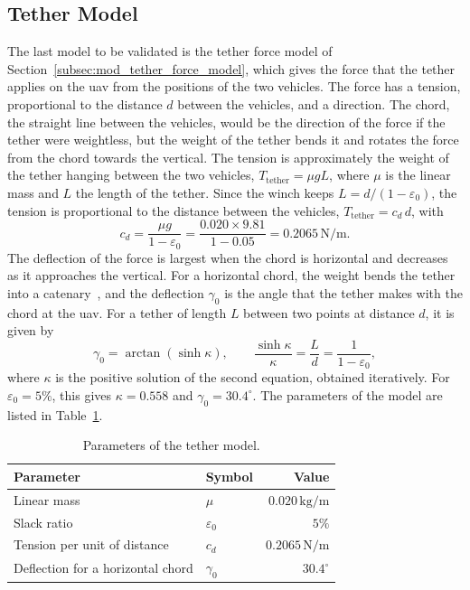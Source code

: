 \subsection{Tether Model}
\label{subsec:tether_model_validation}

The last model to be validated is the tether force model of Section~\ref{subsec:mod_tether_force_model}, which gives the force that the tether applies on the \gls{uav} from the positions of the two vehicles. The force has a tension, proportional to the distance $d$ between the vehicles, and a direction. The chord, the straight line between the vehicles, would be the direction of the force if the tether were weightless, but the weight of the tether bends it and rotates the force from the chord towards the vertical. The tension is approximately the weight of the tether hanging between the two vehicles, $T_{\mathrm{tether}} = \mu g L$, where $\mu$ is the linear mass and $L$ the length of the tether. Since the winch keeps $L = d/(1-\varepsilon_0)$, the tension is proportional to the distance between the vehicles, $T_{\mathrm{tether}} = c_d\, d$, with
\begin{equation}
    c_d = \frac{\mu g}{1-\varepsilon_0} = \frac{0.020 \times 9.81}{1-0.05} = 0.2065\,\text{N/m}.
\end{equation}
The deflection of the force is largest when the chord is horizontal and decreases as it approaches the vertical. For a horizontal chord, the weight bends the tether into a catenary~\cite{irvine1981cable}, and the deflection $\gamma_0$ is the angle that the tether makes with the chord at the \gls{uav}. For a tether of length $L$ between two points at distance $d$, it is given by
\begin{equation}
    \gamma_0 = \arctan\left(\sinh \kappa\right), \qquad \frac{\sinh \kappa}{\kappa} = \frac{L}{d} = \frac{1}{1-\varepsilon_0},
\end{equation}
where $\kappa$ is the positive solution of the second equation, obtained iteratively. For $\varepsilon_0 = 5\%$, this gives $\kappa = 0.558$ and $\gamma_0 = 30.4^\circ$. The parameters of the model are listed in Table~\ref{tab:tether_model_parameters}.

\begin{table}[htbp]
    \centering
    \caption{Parameters of the tether model.}
    \label{tab:tether_model_parameters}
    \begin{tabular}{llr}
        \toprule
        \textbf{Parameter} & \textbf{Symbol} & \textbf{Value} \\
        \midrule
        Linear mass & $\mu$ & $0.020\,\text{kg/m}$ \\
        Slack ratio & $\varepsilon_0$ & $5\%$ \\
        Tension per unit of distance & $c_d$ & $0.2065\,\text{N/m}$ \\
        Deflection for a horizontal chord & $\gamma_0$ & $30.4^\circ$ \\
        \bottomrule
    \end{tabular}
\end{table}


